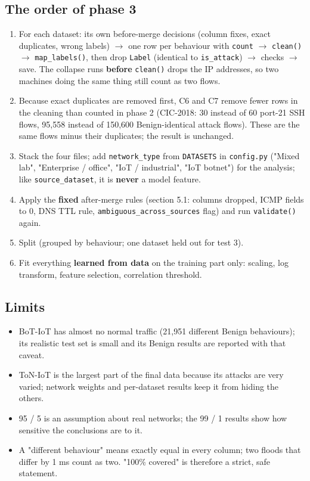 \documentclass[10pt,a4paper]{article}
\newenvironment{problem}{\par\noindent\begin{minipage}{\linewidth}\setlength{\parskip}{4pt}}{\end{minipage}\par\bigskip}
\begin{document}
\begin{problem}\subsection{The order of phase 3}
\begin{enumerate}
\item For each dataset: its own before-merge decisions (column fixes, exact duplicates, wrong labels) $\rightarrow$ one row per behaviour with \texttt{count} $\rightarrow$ \texttt{clean()} $\rightarrow$ \texttt{map\_\allowbreak{}labels()}, then drop \texttt{Label} (identical to \texttt{is\_\allowbreak{}attack}) $\rightarrow$ checks $\rightarrow$ save. The collapse runs \textbf{before} \texttt{clean()} drops the IP addresses, so two machines doing the same thing still count as two flows.
\item Because exact duplicates are removed first, C6 and C7 remove fewer rows in the cleaning than counted in phase 2 (CIC-2018: 30 instead of 60 port-21 SSH flows, 95,558 instead of 150,600 Benign-identical attack flows). These are the same flows minus their duplicates; the result is unchanged.
\item Stack the four files; add \texttt{network\_\allowbreak{}type} from \texttt{DATASETS} in \texttt{config.py} ("Mixed lab", "Enterprise / office", "IoT / industrial", "IoT botnet") for the analysis; like \texttt{source\_\allowbreak{}dataset}, it is \textbf{never} a model feature.
\item Apply the \textbf{fixed} after-merge rules (section 5.1: columns dropped, ICMP fields to 0, DNS TTL rule, \texttt{ambiguous\_\allowbreak{}across\_\allowbreak{}sources} flag) and run \texttt{validate()} again.
\item Split (grouped by behaviour; one dataset held out for test 3).
\item Fit everything \textbf{learned from data} on the training part only: scaling, log transform, feature selection, correlation threshold.
\end{enumerate}
\end{problem}
\begin{problem}\subsection{Limits}
\begin{itemize}
\item BoT-IoT has almost no normal traffic (21,951 different Benign behaviours); its realistic test set is small and its Benign results are reported with that caveat.
\item ToN-IoT is the largest part of the final data because its attacks are very varied; network weights and per-dataset results keep it from hiding the others.
\item 95 / 5 is an assumption about real networks; the 99 / 1 results show how sensitive the conclusions are to it.
\item A "different behaviour" means exactly equal in every column; two floods that differ by 1 ms count as two. "100\% covered" is therefore a strict, safe statement.
\end{itemize}
\end{problem}
\end{document}
